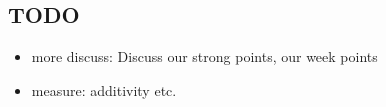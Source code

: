 \subsection{TODO} %
\label{sub:TODO}

\begin{itemize}
  \item more discuss: Discuss our strong points, our week points
  \item measure: additivity etc.
\end{itemize}

